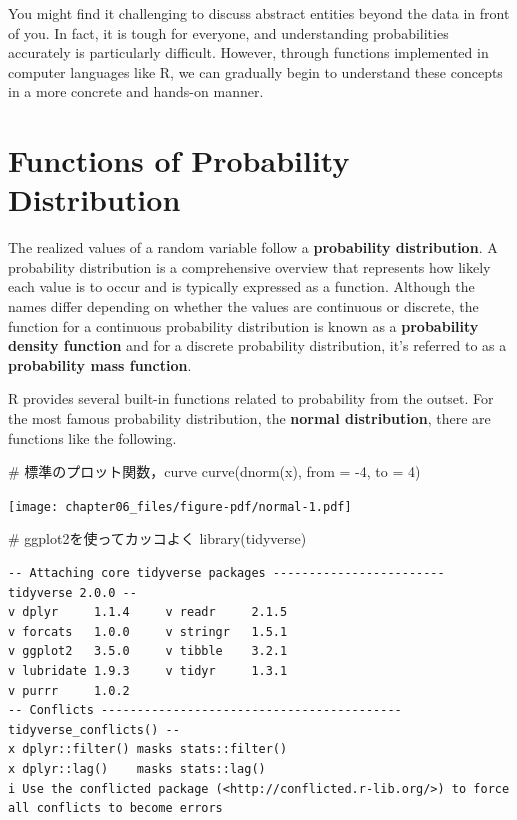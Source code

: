 \documentclass[
  a4paper,
]{book}
\newenvironment{Shaded}{\begin{snugshade}}{\end{snugshade}}
\newcommand{\AttributeTok}[1]{\textcolor[rgb]{0.40,0.45,0.13}{#1}}
\newcommand{\CommentTok}[1]{\textcolor[rgb]{0.37,0.37,0.37}{#1}}
\newcommand{\DecValTok}[1]{\textcolor[rgb]{0.68,0.00,0.00}{#1}}
\newcommand{\FunctionTok}[1]{\textcolor[rgb]{0.28,0.35,0.67}{#1}}
\newcommand{\NormalTok}[1]{\textcolor[rgb]{0.00,0.23,0.31}{#1}}
\newcommand{\SpecialCharTok}[1]{\textcolor[rgb]{0.37,0.37,0.37}{#1}}
\begin{document}
You might find it challenging to discuss abstract entities beyond the
data in front of you. In fact, it is tough for everyone, and
understanding probabilities accurately is particularly difficult.
However, through functions implemented in computer languages like R, we
can gradually begin to understand these concepts in a more concrete and
hands-on manner.

\section{Functions of Probability
Distribution}\label{functions-of-probability-distribution}

The realized values of a random variable follow a \textbf{probability
distribution}. A probability distribution is a comprehensive overview
that represents how likely each value is to occur and is typically
expressed as a function. Although the names differ depending on whether
the values are continuous or discrete, the function for a continuous
probability distribution is known as a \textbf{probability density
function} and for a discrete probability distribution, it's referred to
as a \textbf{probability mass function}.

R provides several built-in functions related to probability from the
outset. For the most famous probability distribution, the \textbf{normal
distribution}, there are functions like the following.

\begin{Shaded}
\begin{Highlighting}[]
\CommentTok{\# 標準のプロット関数，curve}
\FunctionTok{curve}\NormalTok{(}\FunctionTok{dnorm}\NormalTok{(x), }\AttributeTok{from =} \SpecialCharTok{{-}}\DecValTok{4}\NormalTok{, }\AttributeTok{to =} \DecValTok{4}\NormalTok{)}
\end{Highlighting}
\end{Shaded}

\texttt{[image: chapter06\_files/figure-pdf/normal-1.pdf]}

\begin{Shaded}
\begin{Highlighting}[]
\CommentTok{\# ggplot2を使ってカッコよく}
\FunctionTok{library}\NormalTok{(tidyverse)}
\end{Highlighting}
\end{Shaded}

\begin{verbatim}
-- Attaching core tidyverse packages ------------------------ tidyverse 2.0.0 --
v dplyr     1.1.4     v readr     2.1.5
v forcats   1.0.0     v stringr   1.5.1
v ggplot2   3.5.0     v tibble    3.2.1
v lubridate 1.9.3     v tidyr     1.3.1
v purrr     1.0.2     
-- Conflicts ------------------------------------------ tidyverse_conflicts() --
x dplyr::filter() masks stats::filter()
x dplyr::lag()    masks stats::lag()
i Use the conflicted package (<http://conflicted.r-lib.org/>) to force all conflicts to become errors
\end{verbatim}
\end{document}
